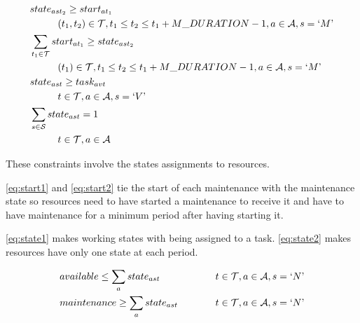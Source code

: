\documentclass{roadef}
\newcommand{\mq}[1] {`#1\textrm'}
\begin{document}
    \begin{align}
        & state_{ast_2} \geq start_{at_1} \notag\\
                & \hspace{10mm} (t_1, t_2) \in \mathcal{T}, t_1 \leq t_2 \leq t_1 + M\_DURATION - 1, a \in \mathcal{A}, s = \mq{M} \label{eq:start1}\\
        & \sum_{t_1 \in \mathcal{T}} start_{at_1} \geq state_{ast_2} \notag\\
                & \hspace{10mm} (t_1) \in \mathcal{T}, t_1 \leq t_2 \leq t_1 + M\_DURATION - 1, a \in \mathcal{A}, s = \mq{M} \label{eq:start2}\\
        & state_{ast} \geq task_{avt} \notag\\
                & \hspace{10mm} t \in \mathcal{T}, a \in \mathcal{A}, s = \mq{V} \label{eq:state1}\\
        & \sum_{s \in \mathcal{S}} state_{ast} = 1 \notag\\
                & \hspace{10mm} t \in \mathcal{T}, a \in \mathcal{A} \label{eq:state2}\\
    \end{align}

    These constraints involve the states assignments to resources.

    \ref{eq:start1} and \ref{eq:start2} tie the start of each maintenance with the maintenance state so resources need to have started a maintenance to receive it and have to have maintenance for a minimum period after having starting it.

    \ref{eq:state1} makes working states with being assigned to a task. \ref{eq:state2} makes resources have only one state at each period.

    \begin{align}
        & available \leq \sum_{a} state_{ast}
                & \hspace{10mm} t \in \mathcal{T}, a \in \mathcal{A}, s = \mq{N} \label{eq:available}\\
        & maintenance \geq \sum_{a} state_{ast}
                & \hspace{10mm} t \in \mathcal{T}, a \in \mathcal{A}, s = \mq{N} \label{eq:maintenance}\\
    \end{align}
\end{document}
